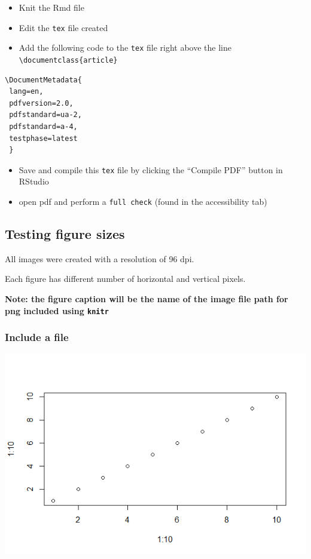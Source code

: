 \documentclass[
]{article}
\providecommand{\tightlist}{%
  \setlength{\itemsep}{0pt}\setlength{\parskip}{0pt}}
\begin{document}
\begin{itemize}
\tightlist
\item
  Knit the Rmd file
\item
  Edit the \texttt{tex} file created
\item
  Add the following code to the \texttt{tex} file right above the line
  \texttt{\textbackslash{}documentclass\{article\}}
\end{itemize}

\begin{verbatim}
\DocumentMetadata{
 lang=en,
 pdfversion=2.0,
 pdfstandard=ua-2,
 pdfstandard=a-4,
 testphase=latest
 }
\end{verbatim}

\begin{itemize}
\tightlist
\item
  Save and compile this \texttt{tex} file by clicking the ``Compile
  PDF'' button in RStudio
\item
  open pdf and perform a \texttt{full\ check} (found in the
  accessibility tab)
\end{itemize}

\subsection{Testing figure sizes}\label{testing-figure-sizes}

All images were created with a resolution of 96 dpi.

Each figure has different number of horizontal and vertical pixels.

\textbf{Note: the figure caption will be the name of the image file path
for png included using \texttt{knitr}}

\subsubsection{Include a file}\label{include-a-file}

\includegraphics[width=600px]{figures/test6}
\end{document}
